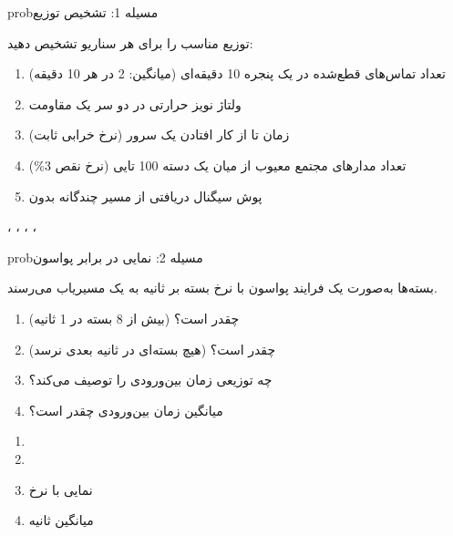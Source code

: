 \begin{PSbox}[unbreakable]{prob}{مسیله 1: تشخیص توزیع}

توزیع مناسب را برای هر سناریو تشخیص دهید:

\begin{enumerate}
\def\labelenumi{(\alph{enumi})}
\tightlist
\item
  تعداد تماس‌های قطع‌شده در یک پنجره 10 دقیقه‌ای (میانگین: 2 در هر 10 دقیقه)
\item
  ولتاژ نویز حرارتی در دو سر یک مقاومت
\item
  زمان تا از کار افتادن یک سرور (نرخ خرابی ثابت)
\item
  تعداد مدارهای مجتمع معیوب از میان یک دسته 100 تایی (نرخ نقص 3\%)
\item
  پوش سیگنال دریافتی از مسیر چندگانه بدون 
\end{enumerate}

\PSsolution{} ، ، ، ، 

\end{PSbox}

\begin{PSbox}[unbreakable]{prob}{مسیله 2: نمایی در برابر پواسون}

بسته‌ها به‌صورت یک فرایند پواسون با نرخ  بسته بر ثانیه به یک مسیریاب می‌رسند.

\begin{enumerate}
\def\labelenumi{(\alph{enumi})}
\tightlist
\item
  (بیش از 8 بسته در 1 ثانیه) چقدر است؟
\item
  (هیچ بسته‌ای در  ثانیه بعدی نرسد) چقدر است؟
\item
  چه توزیعی زمان بین‌ورودی را توصیف می‌کند؟
\item
  میانگین زمان بین‌ورودی چقدر است؟
\end{enumerate}

\PSsolution{} 

\begin{enumerate}
\def\labelenumi{(\alph{enumi})}
\tightlist
\item
\item
\item
  نمایی با نرخ 
\item
  میانگین  ثانیه
\end{enumerate}

\end{PSbox}

